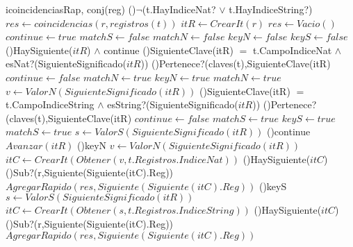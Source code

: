 \begin{Algoritmos}
  \begin{algoritmo}{icoincidenciasRap}{, }{conj(reg)}
  \eIf(){$\neg$(t.HayIndiceNat? $\lor$ t.HayIndiceString?)}{
  	$res \gets coincidencias(r, registros(t))$ 
  }{
  	$itR \gets CrearIt(r)$ 
  	$res \gets Vacio()$ 
  	$continue \gets true$ 
    $matchS \gets false$ 
    $matchN \gets false$ 
    $keyN \gets false$ 
    $keyS \gets false$ 
  	\While(){HaySiguiente($itR$) $\land$ continue}{
    	\If(){SiguienteClave(itR) $=$ t.CampoIndiceNat $\land$ esNat?(SiguienteSignificado($itR$))}{
  			\eIf(){Pertenece?(claves(t),SiguienteClave(itR)}{
            		$continue \gets false$ 
            		$matchN \gets true$ 
					$keyN \gets true$ 
            }{
            		$matchN \gets true$ 
            		$v \gets ValorN(SiguienteSignificado(itR))$  
            }
  		}
  		\If(){SiguienteClave(itR) $=$ t.CampoIndiceString $\land$ esString?(SiguienteSignificado($itR$))}{
  			\eIf(){Pertenece?(claves(t),SiguienteClave(itR)}{
            	$continue \gets false$ 
            	$matchS \gets true$ 
				$keyS \gets true$ 
            }{
            	$matchS \gets true$ 
            	$s \gets ValorS(SiguienteSignificado(itR))$  
            }
		}   
  		\If(){continue}{
  			$Avanzar(itR) $ 
  		}
  	}
    \If(){keyN}{
    	$v \gets ValorN(SiguienteSignificado(itR))$ 
  		$itC \gets CrearIt(Obtener(v,t.Registros.IndiceNat))$ 			 %
  		\If(){HaySiguiente($itC$)}{							 	 %
  			\If(){Sub?(r,Siguiente(Siguiente(itC).Reg))}{
  				$AgregarRapido(res,Siguiente(Siguiente(itC).Reg))$ 
  			}
  		}
	}        
  	\If(){keyS}{ 
    	$s \gets ValorS(SiguienteSignificado(itR))$ 
        $itC \gets CrearIt(Obtener(s,t.Registros.IndiceString))$  	  %
        \If(){HaySiguiente($itC$)}{								  %
        	\If(){Sub?(r,Siguiente(Siguiente(itC).Reg))}{
        		$AgregarRapido(res,Siguiente(Siguiente(itC).Reg))$ 
        	}
}}}
\end{algoritmo}
\end{Algoritmos}
